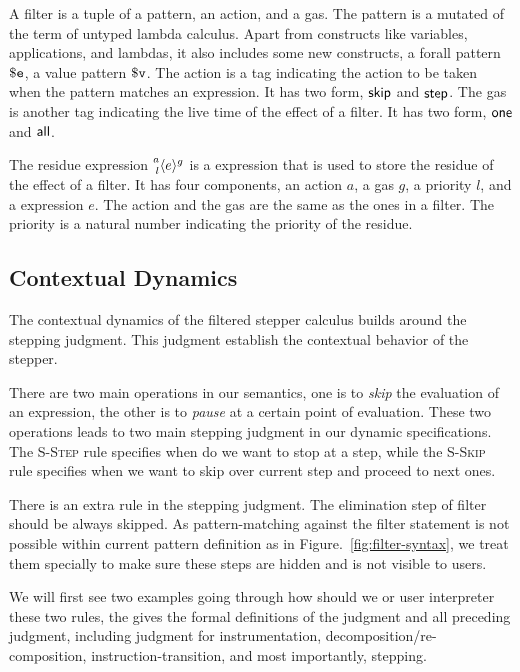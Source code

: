 A filter is a tuple of a pattern, an action, and a gas. The pattern
is a mutated of the term of untyped lambda calculus. Apart from constructs like
variables, applications, and lambdas, it also includes some new constructs, a
forall pattern \(\PatExpr\), a value pattern \(\PatValue\). The action is a tag indicating
the action to be taken when the pattern matches an expression. It has two
form, \(\ActSkip\) and \(\ActStep\). The gas is another tag indicating the
live time of the effect of a filter. It has two form, \(\GasOne\) and
\(\GasAll\).

The residue expression \(\Residue{a}{g}{l}{e}\) is a expression that is used to
store the residue of the effect of a filter. It has four components, an action
\(a\), a gas \(g\), a priority \(l\), and a expression \(e\). The action and the
gas are the same as the ones in a filter. The priority is a natural number
indicating the priority of the residue.

\subsection{Contextual Dynamics}

The contextual dynamics of the filtered stepper calculus builds around
the stepping judgment. This judgment establish the contextual behavior
of the stepper.

There are two main operations in our semantics, one is to \emph{skip} the
evaluation of an expression, the other is to \emph{pause} at a certain point of
evaluation. These two operations leads to two main stepping judgment in our
dynamic specifications. The \textsc{S-Step} rule specifies when do we want to
stop at a step, while the \textsc{S-Skip} rule specifies when we want to skip over
current step and proceed to next ones.

There is an extra rule in the stepping judgment. The elimination step of filter
should be always skipped. As pattern-matching against the filter statement is
not possible within current pattern definition as in
Figure.~\ref{fig:filter-syntax}, we treat them specially to make sure these
steps are hidden and is not visible to users.

We will first see two examples going through how should we or user
interpreter these two rules, the gives the formal definitions of the
judgment and all preceding judgment, including judgment for
instrumentation, decomposition/re-composition, instruction-transition,
and most importantly, stepping.

